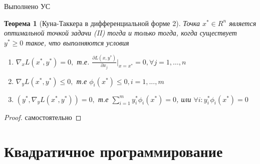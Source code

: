 \documentclass[a4paper]{article}
\newtheorem{theorem}{Теорема}[section]
\theoremstyle{definition}
\theoremstyle{remark}
\begin{document}
Выполнено УС

\begin{theorem}[Куна-Таккера в дифференциальной форме 2]
    Точка $x^*\in R^n$ является оптимальной точкой задачи (II)
    тогда и только тогда, когда существует $y^*\ge 0$ такое, что выполняются условия
    \begin{enumerate}
        \item $\nabla_x L(x^*, y^*) = 0,$ т.е.
        $\frac{\partial L(x, y^*)}{\partial x_j} |_{x = x^*} = 0, \forall j = 1, \dots, n$
        \item $\nabla_y L(x^*, y^*) \le 0,$ т.е $\phi_i(x^*)\le 0, i = 1, ..., m$
        \item $(y^*, \nabla_y L(x^*, y^*)) = 0, $ т.е $\sum_{i = 1}^{m}y^*_i \phi_i(x^*) = 0$, или $\forall i: y^*_i \phi_i(x^*) = 0$
    \end{enumerate}
\end{theorem}
\begin{proof}
    самостоятельно
\end{proof}
\section{Квадратичное программирование}
\end{document}
